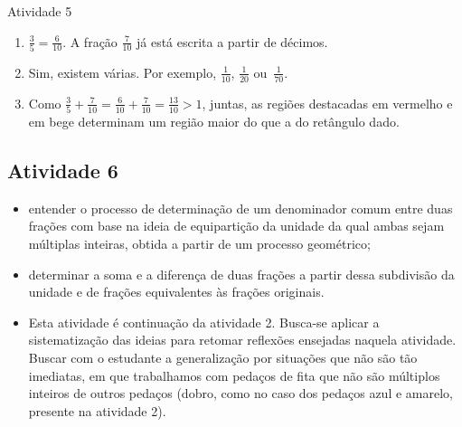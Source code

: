 \begin{multicols}{2}
\begin{resposta*}{Atividade 5}
\begin{enumerate} [\quad a)]
    \item             $\frac{3}{5} = \frac{6}{10}$. A fração       $\frac{7}{10}$       já está escrita a partir de décimos.
    \item       Sim, existem várias. Por exemplo,       $\frac{1}{10}$,       $\frac{1}{20}$       ou~$\frac{1}{70}$.
    \item       Como       $\frac{3}{5}+\frac{7}{10} = \frac{6}{10} + \frac{7}{10} = \frac{13}{10} > 1$, juntas, as regiões destacadas em vermelho e em bege determinam um região maior do que a do retângulo dado.
\end{enumerate} %


\end{resposta*}

\subsection{Atividade 6}

\newline \vspace{.15cm}

\begin{itemize} %
 \item  entender o processo de determinação de um denominador comum entre duas frações com base na ideia de equipartição da unidade da qual ambas sejam múltiplas inteiras, obtida a partir de um processo geométrico;
  \item      determinar a soma e a diferença de duas frações a partir dessa subdivisão da unidade e de frações equivalentes às frações originais.
\end{itemize} %


 \vspace{.15cm}

\begin{itemize} %
  \item     Esta atividade é continuação da atividade 2. Busca-se aplicar a sistematização das ideias para retomar reflexões ensejadas naquela atividade. Buscar com o estudante a generalização por situações que não são tão imediatas, em que trabalhamos com pedaços de fita que não são múltiplos inteiros de outros pedaços (dobro, como no caso dos pedaços azul e amarelo, presente na atividade 2).



\end{itemize}
\end{multicols}
